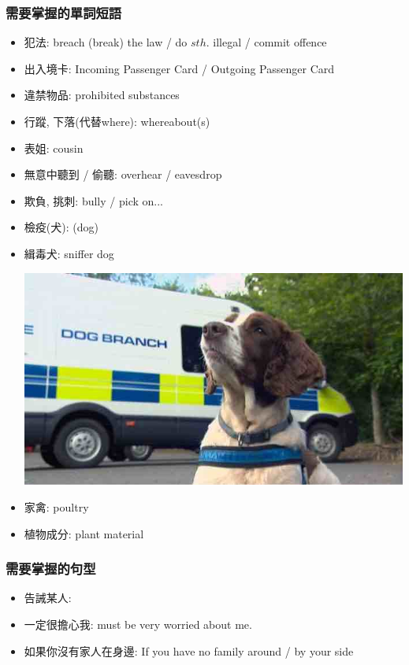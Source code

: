 \subsubsection*{需要掌握的單詞短語}
\begin{multicols}{2}
\begin{itemize}
  \itemsep0em
  \item 犯法: breach (break) the law / do $sth.$ illegal / commit offence
  \item 出入境卡: Incoming Passenger Card / Outgoing Passenger Card
  \item 違禁物品: prohibited substances
  \item 行蹤, 下落(代替where): whereabout(s)
  \item 表姐: cousin
  \item 無意中聽到 / 偷聽: overhear / eavesdrop
  \item 欺負, 挑刺: bully / pick on...
  \item 檢疫(犬):  (dog)
  \item 緝毒犬: sniffer dog
  \begin{center}
      \includegraphics[scale=.3]{pics/sniffer-dog}
  \end{center}
  \item 家禽: poultry
  \item 植物成分: plant material
\end{itemize}
\end{multicols}

\subsubsection*{需要掌握的句型}
\begin{itemize}
  \itemsep0em
  \item 告誡某人: 
  \item 一定很擔心我: must be very worried about me.
  \item 如果你沒有家人在身邊: If you have no family around / by your side
\end{itemize}

